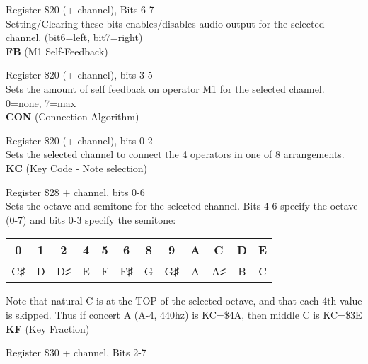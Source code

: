 Register \$20 (+ channel), Bits 6-7\\

Setting/Clearing these bits enables/disables audio output for the selected
channel. (bit6=left, bit7=right)\\

{\bfseries FB} (M1 Self-Feedback)

Register \$20 (+ channel), bits 3-5\\

Sets the amount of self feedback on operator M1 for the selected channel.
0=none, 7=max\\

{\bfseries CON} (Connection Algorithm)

Register \$20 (+ channel), bits 0-2\\

Sets the selected channel to connect the 4 operators in one of 8 arrangements.\\


{\bfseries KC} (Key Code - Note selection)

Register \$28 + channel, bits 0-6\\

Sets the octave and semitone for the selected channel.  Bits 4-6 specify the
octave (0-7) and bits 0-3 specify the semitone:

\begin{tabular}{|c|c|c|c|c|c|c|c|c|c|c|c|}
	\hline

	0&1&2&4&5&6&8&9&A&C&D&E\\ \hline

	{\ttfamily C♯}&{\ttfamily D}&{\ttfamily D♯}&{\ttfamily E}&{\ttfamily F}&{\ttfamily F♯}&{\ttfamily G}&{\ttfamily G♯}&{\ttfamily A}&{\ttfamily A♯}&{\ttfamily B}&{\ttfamily C}\\

	\hline
\end{tabular}

\vspace{16pt}

Note that natural C is at the TOP of the selected octave, and that each 4th
value is skipped. Thus if concert A (A-4, 440hz) is KC=\$4A, then middle C is
KC=\$3E\\

{\bfseries KF} (Key Fraction)

Register \$30 + channel, Bits 2-7\\

